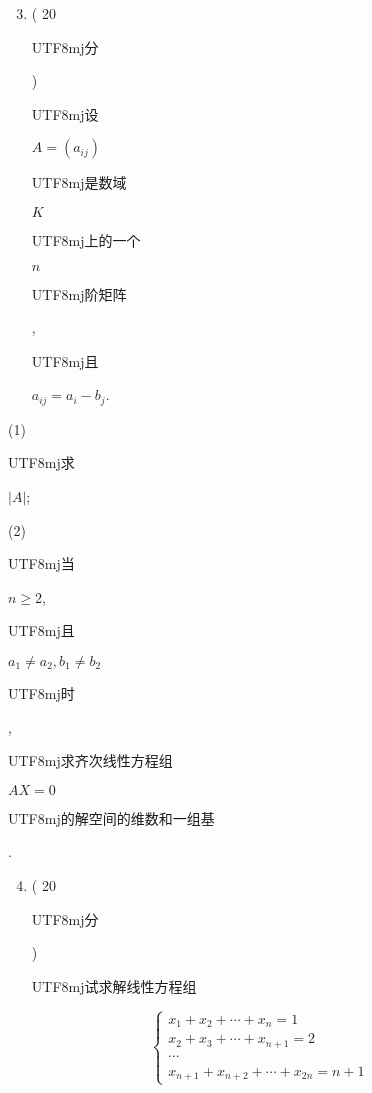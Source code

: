 \documentclass[10pt]{article}
\begin{document}
\begin{enumerate}
  \setcounter{enumi}{2}
  \item ( 20 \begin{CJK}{UTF8}{mj}分\end{CJK}) \begin{CJK}{UTF8}{mj}设\end{CJK} $A=\left(a_{i j}\right)$ \begin{CJK}{UTF8}{mj}是数域\end{CJK} $K$ \begin{CJK}{UTF8}{mj}上的一个\end{CJK} $n$ \begin{CJK}{UTF8}{mj}阶矩阵\end{CJK}, \begin{CJK}{UTF8}{mj}且\end{CJK} $a_{i j}=a_{i}-b_{j}$.
\end{enumerate}
(1) \begin{CJK}{UTF8}{mj}求\end{CJK} $|A|$;

(2) \begin{CJK}{UTF8}{mj}当\end{CJK} $n \geqslant 2$, \begin{CJK}{UTF8}{mj}且\end{CJK} $a_{1} \neq a_{2}, b_{1} \neq b_{2}$ \begin{CJK}{UTF8}{mj}时\end{CJK}, \begin{CJK}{UTF8}{mj}求齐次线性方程组\end{CJK} $A X=0$ \begin{CJK}{UTF8}{mj}的解空间的维数和一组基\end{CJK}.

\begin{enumerate}
  \setcounter{enumi}{3}
  \item ( 20 \begin{CJK}{UTF8}{mj}分\end{CJK}) \begin{CJK}{UTF8}{mj}试求解线性方程组\end{CJK}
\end{enumerate}
$$
\left\{\begin{array}{l}
x_{1}+x_{2}+\cdots+x_{n}=1 \\
x_{2}+x_{3}+\cdots+x_{n+1}=2 \\
\cdots \\
x_{n+1}+x_{n+2}+\cdots+x_{2 n}=n+1
\end{array}\right.
$$
\end{document}

